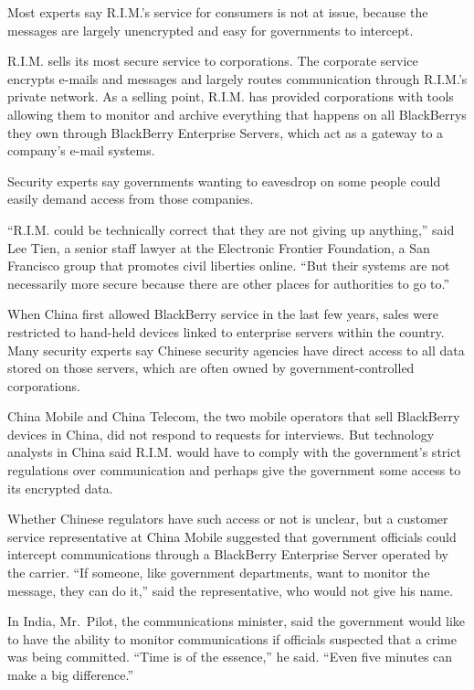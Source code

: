 ﻿\documentclass[12pt]{article}
\begin{document}
Most experts say R.I.M.'s service for consumers is not at issue, because the messages are largely
unencrypted and easy for governments to intercept.

R.I.M. sells its most secure service to corporations. The corporate service encrypts e-mails and
messages and largely routes communication through R.I.M.'s private network. As a selling point,
R.I.M. has provided corporations with tools allowing them to monitor and archive everything that
happens on all BlackBerrys they own through BlackBerry Enterprise Servers, which act as a gateway to
a company's e-mail systems.

Security experts say governments wanting to eavesdrop on some people could easily demand access from
those companies.

``R.I.M. could be technically correct that they are not giving up anything,'' said Lee Tien, a
senior staff lawyer at the Electronic Frontier Foundation, a San Francisco group that promotes civil
liberties online. ``But their systems are not necessarily more secure because there are other places
for authorities to go to.''

When China first allowed BlackBerry service in the last few years, sales were restricted to
hand-held devices linked to enterprise servers within the country. Many security experts say Chinese
security agencies have direct access to all data stored on those servers, which are often owned by
government-controlled corporations.

China Mobile and China Telecom, the two mobile operators that sell BlackBerry devices in China, did
not respond to requests for interviews. But technology analysts in China said R.I.M. would have to
comply with the government's strict regulations over communication and perhaps give the government
some access to its encrypted data.

Whether Chinese regulators have such access or not is unclear, but a customer service representative
at China Mobile suggested that government officials could intercept communications through a
BlackBerry Enterprise Server operated by the carrier. ``If someone, like government departments,
want to monitor the message, they can do it,'' said the representative, who would not give his name.

In India, Mr.~Pilot, the communications minister, said the government would like to have the ability
to monitor communications if officials suspected that a crime was being committed. ``Time is of the
essence,'' he said. ``Even five minutes can make a big difference.''
\end{document}
